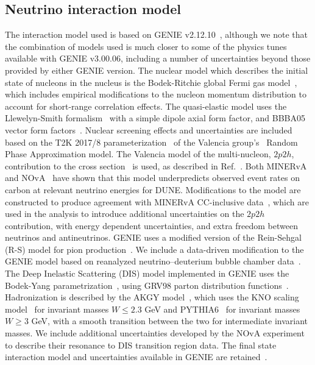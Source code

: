 \subsection{Neutrino interaction model}
The interaction model used is based on GENIE v2.12.10~\cite{Andreopoulos:2009rq,Andreopoulos:2015wxa}, although we note that the combination of models used is much closer to some of the physics tunes available with GENIE v3.00.06, including a number of uncertainties beyond those provided by either GENIE version. The nuclear model which describes the initial state of nucleons in the nucleus is the Bodek-Ritchie global Fermi gas model~\cite{BodekRitchie}, which includes empirical modifications to the nucleon momentum distribution to account for short-range correlation effects. The quasi-elastic model uses the Llewelyn-Smith formalism~\cite{llewelyn-smith} with a simple dipole axial form factor, and BBBA05 vector form factors~\cite{bbba05}. Nuclear screening effects and uncertainties are included based on the T2K 2017/8 parameterization~\cite{Abe:2018wpn} of the Valencia group's~\cite{nieves1,nieves2} Random Phase Approximation model. The Valencia model of the multi-nucleon, $2p2h$, contribution to the cross section~\cite{nieves1,nieves2} is used, as described in Ref.~\cite{Schwehr:2016pvn}. Both MINERvA~\cite{Rodrigues:2015hik} and NOvA~\cite{NOvA:2018gge} have shown that this model underpredicts observed event rates on carbon at relevant neutrino energies for DUNE. Modifications to the model are constructed to produce agreement with MINERvA CC-inclusive data~\cite{Rodrigues:2015hik}, which are used in the analysis to introduce additional uncertainties on the $2p2h$ contribution, with energy dependent uncertainties, and extra freedom between neutrinos and antineutrinos. GENIE uses a modified version of the Rein-Sehgal (R-S) model for pion production~\cite{Rein:1980wg}. We include a data-driven modification to the GENIE model based on reanalyzed neutrino--deuterium bubble chamber data~\cite{Wilkinson:2014yfa,Rodrigues:2016xjj}. The Deep Inelastic Scattering (DIS) model implemented in GENIE uses the Bodek-Yang parametrization~\cite{Bodek:2002ps}, using GRV98 parton distribution functions~\cite{Gluck:1998xa}. Hadronization is described by the AKGY model~\cite{Yang:2009zx}, which uses the KNO scaling model~\cite{Koba:1972ng} for invariant masses $W \leq 2.3$ GeV and PYTHIA6~\cite{Sjostrand:2006za} for invariant masses $W \geq 3$ GeV, with a smooth transition between the two for intermediate invariant masses. We include additional uncertainties developed by the NOvA experiment~\cite{nova_2018} to describe their resonance to DIS transition region data. The final state interaction model and uncertainties available in GENIE are retained~\cite{Dytman:2011zz,Dytman:2015taa,intranuke_2009}.

